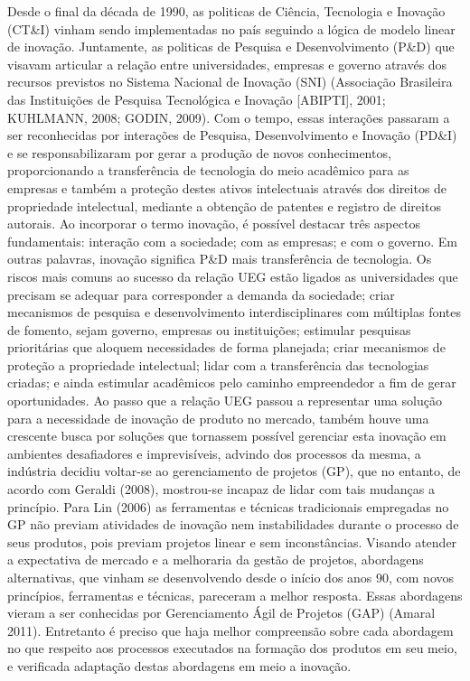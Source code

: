 Desde o final da década de 1990, as politicas de Ciência, Tecnologia e Inovação (CT\&I) vinham sendo implementadas no país seguindo a lógica de modelo linear de inovação. Juntamente, as politicas de Pesquisa e Desenvolvimento (P\&D) que visavam articular a relação entre universidades, empresas e governo através dos recursos previstos no Sistema Nacional de Inovação (SNI) (Associação Brasileira das Instituições de Pesquisa Tecnológica e Inovação [ABIPTI], 2001; KUHLMANN, 2008; GODIN, 2009).
Com o tempo, essas interações passaram a ser reconhecidas por interações de Pesquisa, Desenvolvimento e Inovação (PD\&I) e se responsabilizaram por gerar a produção de novos conhecimentos, proporcionando a transferência de tecnologia do meio acadêmico para as empresas e também a proteção destes ativos intelectuais através dos direitos de propriedade intelectual, mediante a obtenção de patentes e registro de direitos autorais. Ao incorporar o termo inovação, é possível destacar três aspectos fundamentais: interação com a sociedade; com as empresas; e com o governo. Em outras palavras, inovação significa P\&D mais transferência de tecnologia.
Os riscos mais comuns ao sucesso da relação UEG estão ligados as universidades que precisam se adequar para corresponder a demanda da sociedade; criar mecanismos de pesquisa e desenvolvimento interdisciplinares com múltiplas fontes de fomento, sejam governo, empresas ou instituições; estimular pesquisas prioritárias que aloquem necessidades de forma planejada; criar mecanismos de proteção a propriedade intelectual; lidar com a transferência das tecnologias criadas; e ainda estimular acadêmicos pelo caminho empreendedor a fim de gerar oportunidades.
Ao passo que a relação UEG passou a representar uma solução para a necessidade de inovação de produto no mercado, também houve uma crescente busca por soluções que tornassem possível gerenciar esta inovação em ambientes desafiadores e imprevisíveis, advindo dos processos da mesma, a indústria decidiu voltar-se ao gerenciamento de projetos (GP), que no entanto, de acordo com Geraldi (2008), mostrou-se incapaz de lidar com tais mudanças a princípio.
Para Lin (2006) as ferramentas e técnicas tradicionais empregadas no GP não previam atividades de inovação nem instabilidades durante o processo de seus produtos, pois previam projetos linear e sem inconstâncias.
Visando atender a expectativa de mercado e a melhoraria da gestão de projetos, abordagens alternativas, que vinham se desenvolvendo desde o início dos anos 90, com novos princípios, ferramentas e técnicas, pareceram a melhor resposta. Essas abordagens vieram a ser conhecidas por Gerenciamento Ágil de Projetos (GAP) (Amaral 2011).
Entretanto é preciso que haja melhor compreensão sobre cada abordagem no que respeito aos processos executados na formação dos produtos em seu meio, e verificada adaptação destas abordagens em meio a inovação.


